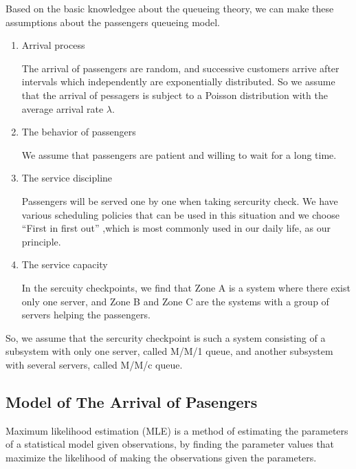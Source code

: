 \documentclass{mcmthesis}
\begin{document}
	Based on the basic knowledgee about the queueing theory, we can make these assumptions about the passengers queueing model.
		\begin{enumerate}
			\item Arrival process
			
			 The arrival of passengers are random, and successive customers arrive after intervals which independently are exponentially distributed. So we assume that the arrival of pessagers is subject to a Poisson distribution with the average arrival rate ${\lambda}$.
			\item The behavior of passengers 
			
			 We assume that passengers are patient and willing to wait for a long time.
			\item The service discipline 
			
			 Passengers will be served one by one when taking sercurity check. We have various scheduling policies that can be used in this situation and we choose ``First in first out'' ,which is most commonly used in our daily life, as our principle.
			\item The service capacity 
			
			 In the sercuity checkpoints, we find that Zone A is a system where there exist only one server, and Zone B and Zone C are the systems with a group of servers helping the passengers.
		\end{enumerate}	
		
	So, we assume that the sercurity checkpoint is such a system consisting of a subsystem with only one server, called M/M/1 queue, and another subsystem with several servers, called M/M/c queue.

	\subsection{Model of The Arrival of Pasengers} \label{flag1.1} %
		Maximum likelihood estimation (MLE) is a method of estimating the parameters of a statistical model given observations, by finding the parameter values that maximize the likelihood of making the observations given the parameters. 
\end{document}
